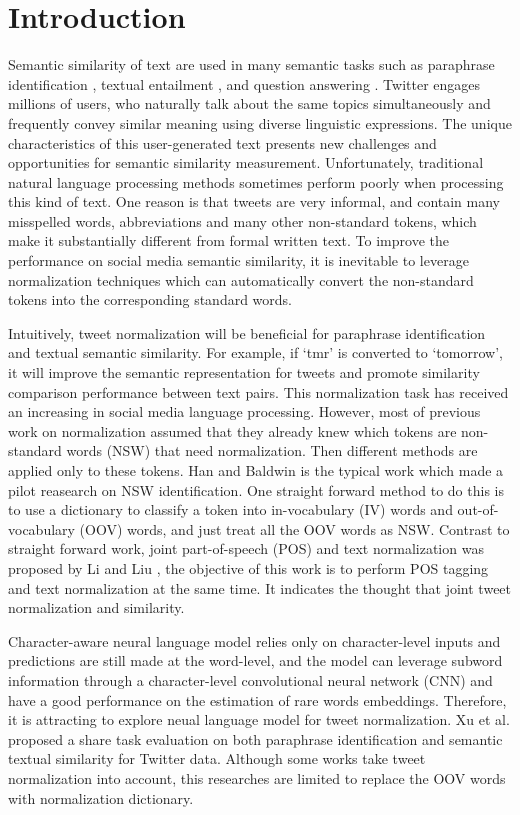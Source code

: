 \documentclass[letterpaper]{article}
\begin{document}
\section{Introduction}
Semantic similarity of text are used in many semantic tasks such as paraphrase identification \cite{Xu-EtAl-2014:TACL}, textual entailment \cite{henderson-popa:2016:P16-1}, and question answering \cite{Severyn:2015:LRS:2766462.2767738}. Twitter engages millions of users, who naturally talk about the same topics simultaneously and frequently convey similar meaning using diverse linguistic expressions. The unique characteristics of this user-generated text presents new challenges and opportunities for semantic similarity measurement. Unfortunately, traditional natural language processing methods sometimes perform poorly when processing this kind of text. One reason is that tweets are very informal, and contain many misspelled words, abbreviations and many other non-standard tokens, which make it substantially different from formal written text. To improve the performance on social media semantic similarity, it is inevitable to leverage normalization techniques which can automatically convert the non-standard tokens into the corresponding standard words.

Intuitively, tweet normalization will be beneficial for paraphrase identification and textual  semantic similarity. For example, if `tmr' is converted to `tomorrow', it will improve the semantic representation for tweets and promote similarity comparison performance between text pairs. This normalization task has received an increasing in social media language processing. However, most of previous work on normalization assumed that they already knew which tokens are non-standard words (NSW) that need normalization. Then different methods are applied only to these tokens. Han and Baldwin  is the typical work which made a pilot reasearch on NSW identification. One straight forward method to do this is to use a dictionary to classify a token into in-vocabulary (IV) words and out-of-vocabulary (OOV) words, and just treat all the OOV words as NSW. Contrast to straight forward work, joint part-of-speech (POS) and text normalization was proposed by Li and Liu , the objective of this work is to perform POS tagging and text normalization at the same time. It indicates the thought that joint tweet normalization and similarity.

Character-aware neural language model \cite{Kim-AAAI1612489} relies only on character-level inputs and predictions are still made at the word-level, and the model can leverage subword information through a character-level convolutional neural network (CNN) and have a good performance on the estimation of rare words embeddings. Therefore, it is attracting to explore neual language model for tweet normalization. Xu et al.  proposed a share task evaluation on both  paraphrase identification and semantic textual similarity for Twitter data. Although some works \cite{zarrella-EtAl:2015:SemEval,vandergoot-vannoord:2015:SemEval} take tweet normalization into account, this researches are limited to replace the OOV words with normalization dictionary.
\end{document}
